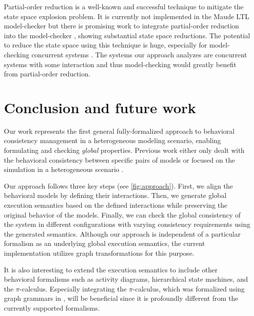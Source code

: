 \documentclass{jot}
\begin{document}
Partial-order reduction is a well-known and successful technique to mitigate the state space explosion problem.
It is currently not implemented in the Maude LTL model-checker but there is promising work to integrate partial-order reduction into the model-checker \cite{farzanPartialOrderReduction2007}, showing substantial state space reductions.
The potential to reduce the state space using this technique is huge, especially for model-checking concurrent systems \cite{clarkeHandbookModelChecking2018}.
The systems our approach analyzes are concurrent systems with some interaction and thus model-checking would greatly benefit from partial-order reduction.


\section{Conclusion and future work} \label{sec:conclusion_and_future_work}
Our work represents the first general fully-formalized approach to behavioral consistency management in a heterogeneous modeling scenario, enabling formulating and checking \emph{global} properties.
Previous work either only dealt with the behavioral consistency between specific pairs of models \cite{yaoConsistencyCheckingUML2006, kusterExplicitBehavioralConsistency2003} or focused on the simulation in a heterogeneous scenario \cite{deantoniModelingBehavioralSemantics2016, varalarsenBCoolBehavioralCoordination2016, ekerTamingHeterogeneityPtolemy2003, leeDisciplinedHeterogeneousModeling2010}.

Our approach follows three key steps (see \autoref{fig:approach}).
First, we align the behavioral models by defining their interactions.
Then, we generate global execution semantics based on the defined interactions while preserving the original behavior of the models.
Finally, we can check the global consistency of the system in different configurations with varying consistency requirements using the generated semantics.
Although our approach is independent of a particular formalism as an underlying global execution semantics, the current implementation utilizes graph transformations for this purpose.

It is also interesting to extend the execution semantics to include other behavioral formalisms such as activity diagrams, hierarchical state machines, and the $\pi$-calculus.
Especially integrating the $\pi$-calculus, which was formalized using graph grammars in \cite{gadducciGraphRewritingPcalculus2007}, will be beneficial since it is profoundly different from the currently supported formalisms.
\end{document}
